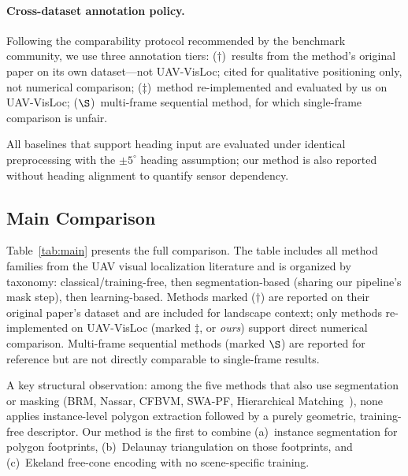 \documentclass[10pt]{article}
\theoremstyle{plain}
\theoremstyle{definition}
\begin{document}
\paragraph{Cross-dataset annotation policy.}
Following the comparability protocol recommended by the benchmark community,
we use three annotation tiers: ($\dagger$)~results from the method's original
paper on its own dataset---not UAV-VisLoc; cited for qualitative positioning
only, not numerical comparison; ($\ddagger$)~method re-implemented and
evaluated by us on UAV-VisLoc; ($\S$)~multi-frame sequential method, for which
single-frame comparison is unfair.

All baselines that support heading input are evaluated under identical
preprocessing with the $\pm5^\circ$ heading assumption; our method is also
reported without heading alignment to quantify sensor dependency.

\subsection{Main Comparison}
\label{sec:main_comp}

Table~\ref{tab:main} presents the full comparison.
The table includes all method families from the UAV visual localization
literature and is organized by taxonomy: classical/training-free, then
segmentation-based (sharing our pipeline's mask step), then learning-based.
Methods marked ($\dagger$) are reported on their original paper's dataset and
are included for landscape context; only methods re-implemented on UAV-VisLoc
(marked $\ddagger$, or \emph{ours}) support direct numerical comparison.
Multi-frame sequential methods (marked $\S$) are reported for reference but
are not directly comparable to single-frame results.

A key structural observation: among the five methods that also use
segmentation or masking (BRM, Nassar, CFBVM, SWA-PF, Hierarchical
Matching~\cite{hieruav2025}), none applies instance-level polygon extraction
followed by a purely geometric, training-free descriptor.
Our method is the first to combine (a)~instance segmentation for polygon
footprints, (b)~Delaunay triangulation on those footprints, and
(c)~Ekeland free-cone encoding with no scene-specific training.
\end{document}
